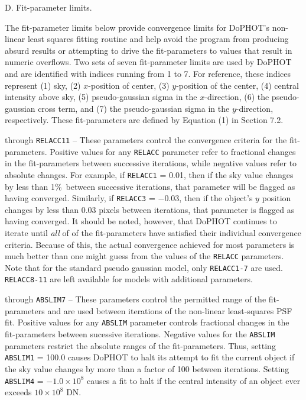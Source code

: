 \noindent D. Fit-parameter limits.  

The fit-parameter limits below provide convergence limits for
DoPHOT's non-linear least squares fitting routine and help avoid the 
program from producing absurd results or attempting to drive
the fit-parameters to values that result in numeric overflows.  Two sets of 
seven fit-parameter limits are used by DoPHOT and are identified
with indices running from 1 to 7.    For reference, these indices represent 
(1) sky, (2) $x$-position of center, (3) $y$-position of the center,
(4) central intensity above sky, (5) pseudo-gaussian sigma in the 
$x$-direction, (6) the pseudo-gaussian cross term, and (7) the pseudo-gaussian
sigma in the $y$-direction, respectively.  These fit-parameters
are defined by Equation (1) in Section 7.2.

 through {\tt RELACC11} -- These parameters control
the convergence criteria for the fit-parameters.  Positive values for 
any {\tt RELACC} parameter refer to fractional changes in the
fit-parameters between successive iterations, 
while negative values refer to absolute changes.
For example, if {\tt RELACC1} = 0.01, then if the sky value 
changes by less than 1\%\ between successive iterations, that parameter
will be flagged as having converged.  Similarly, if
{\tt RELACC3} = $-0.03$, then if the object's $y$ position  changes
by less than 0.03 pixels between iterations, that parameter is flagged as
having converged.    It should be noted, however, that DoPHOT
continues to iterate until {\it all} of of the fit-parameters have
satisfied their individual convergence criteria.  Because of this, the
actual convergence achieved for most parameters is much better than
one might guess from the values of the {\tt RELACC} parameters.  Note that for
the standard pseudo gaussian model, only {\tt RELACC1-7} are used. 
{\tt RELACC8-11} are left available for models with additional parameters.


 through {\tt ABSLIM7} -- These parameters
control the permitted range of the fit-parameters and are 
used between iterations of the non-linear least-squares PSF fit.  
Positive
values for any {\tt ABSLIM} parameter controls fractional changes
in the fit-parameters between sucessive iterations.
Negative values for 
the {\tt ABSLIM} parameters restrict the absolute
ranges of the fit-parameters.  Thus, setting {\tt ABSLIM1} = 100.0 causes
DoPHOT to halt its attempt to fit the current object if the sky value
changes by more than a factor of 100 between iterations.  
Setting {\tt ABSLIM4} = $-1.0 \times 10^8$
causes a fit to halt if the central intensity of an object ever
exceeds $10 \times 10^8$ DN.

